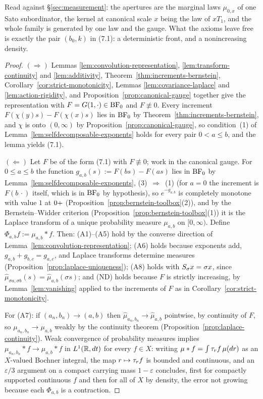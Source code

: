 Read against \S\ref{sec:measurement}: the apertures are the marginal laws $\mu_{0,x}$ of one
Sato subordinator, the kernel at canonical scale $x$ being the law of $xT_1$, and the whole
family is generated by one law and the gauge. What the axioms leave free is exactly the pair
$(b_0, k)$ in (7.1): a deterministic front, and a nonincreasing density.

\begin{proof}
$(\Rightarrow)$ Lemmas \ref{lem:convolution-representation}, \ref{lem:transform-continuity}
and \ref{lem:additivity}, Theorem~\ref{thm:increments-bernstein},
Corollary~\ref{cor:strict-monotonicity}, Lemmas \ref{lem:covariance-laplace} and
\ref{lem:action-rigidity}, and Proposition~\ref{prop:canonical-gauge} together give the
representation with $F = G(1,\cdot) \in \mathrm{BF}_0$ and $F \not\equiv 0$. Every increment
$F(\chi(y)s) - F(\chi(x)s)$ lies in $\mathrm{BF}_0$ by Theorem~\ref{thm:increments-bernstein}, and
$\chi$ is onto $(0,\infty)$ by Proposition~\ref{prop:canonical-gauge}, so condition~(1) of
Lemma~\ref{lem:selfdecomposable-exponents} holds for every pair $0 < a \le b$, and the lemma
yields (7.1).

$(\Leftarrow)$ Let $F$ be of the form (7.1) with $F \not\equiv 0$; work in the canonical
gauge. For $0 \le a \le b$ the function $g_{a,b}(s) := F(bs) - F(as)$ lies in $\mathrm{BF}_0$ by
Lemma~\ref{lem:selfdecomposable-exponents}, (3)~$\Rightarrow$~(1) (for $a = 0$ the increment is
$F(b\,\cdot)$ itself, which is in $\mathrm{BF}_0$ by hypothesis), so $e^{-g_{a,b}}$ is
completely monotone with value $1$ at $0{+}$ (Proposition~\ref{prop:bernstein-toolbox}(2)), and
by the Bernstein--Widder criterion (Proposition~\ref{prop:bernstein-toolbox}(1)) it is the
Laplace transform of a unique probability measure $\mu_{a,b}$ on $[0,\infty)$. Define
$\Phi_{a,b} f := \mu_{a,b} * f$. Then:
(A1)--(A5) hold by the converse direction of Lemma~\ref{lem:convolution-representation};
(A6) holds because exponents add, $g_{a,b} + g_{b,c} = g_{a,c}$, and Laplace transforms
determine measures (Proposition~\ref{prop:laplace-uniqueness});
(A8) holds with $S_\sigma x = \sigma x$, since
$\hat\mu_{\sigma a, \sigma b}(s) = \hat\mu_{a,b}(\sigma s)$;
and (ND) holds because $F$ is strictly increasing, by Lemma~\ref{lem:vanishing} applied to the
increments of $F$ as in Corollary~\ref{cor:strict-monotonicity}.

For (A7): if $(a_n, b_n) \to (a,b)$ then $\hat\mu_{a_n,b_n} \to \hat\mu_{a,b}$ pointwise, by
continuity of $F$, so $\mu_{a_n,b_n} \to \mu_{a,b}$ weakly by the continuity theorem
(Proposition~\ref{prop:laplace-continuity}). Weak convergence of probability measures implies
$\mu_{a_n,b_n} * f \to \mu_{a,b} * f$ in $L^1(\mathbb{R}, dt)$ for every $f \in X$: writing
$\mu * f = \int \tau_r f\, \mu(dr)$ as an $X$-valued Bochner integral, the map
$r \mapsto \tau_r f$ is bounded and continuous, and an $\varepsilon/3$ argument on a compact
carrying mass $1 - \varepsilon$ concludes, first for compactly supported continuous $f$ and
then for all of $X$ by density, the error not growing because each $\Phi_{a,b}$ is a
contraction.


\end{proof}
